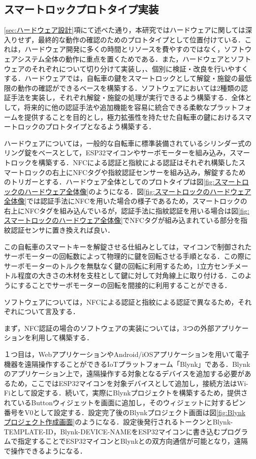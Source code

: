   \subsection{スマートロックプロトタイプ実装}
    \label{sec:スマートロックプロトタイプ実装}
      \par \ref{sec:ハードウェア設計}項にて述べた通り，本研究ではハードウェアに関しては深入りせず，最終的な動作の確認のためのプロトタイプとして位置付けている．これは，ハードウェア開発に多くの時間とリソースを費やすのではなく，ソフトウェアシステム全体の動作に重点を置くためである．また，ハードウェアとソフトウェアのそれぞれについて切り分けて実装し，、個別に検証・改良を行いやすくする．ハードウェアでは，自転車の鍵をスマートロックとして解錠・施錠の最低限の動作の確認ができるベースを構築する．ソフトウェアにおいては2種類の認証手法を実装し，それぞれ解錠・施錠の処理が実行できるよう構築する．全体として，将来的に他の認証手法や追加機能を容易に統合できる柔軟なプラットフォームを提供することを目的とし，極力拡張性を持たせた自転車の鍵におけるスマートロックのプロトタイプとなるよう構築する．
      \par ハードウェアについては，一般的な自転車に標準装備されているシリンダー式のリング錠をベースとして，ESP32マイコンやサーボモーターを組み込み，スマートロックを構築する．NFCによる認証と指紋による認証はそれぞれ構築したスマートロックの右上にNFCタグや指紋認証センサーを組み込み，解錠するためのトリガーとする．ハードウェア全体としてのプロトタイプは図\ref{fig:スマートロックのハードウェア全体像}のようになる．図\ref{fig:スマートロックのハードウェア全体像}では認証手法にNFCを用いた場合の様子であるため，スマートロックの右上にNFCタグを組み込んでいるが，認証手法に指紋認証を用いる場合は図\ref{fig:スマートロックのハードウェア全体像}でNFCタグが組み込まれている部分を指紋認証センサに置き換えれば良い．
      \par この自転車のスマートキーを解錠させる仕組みとしては，マイコンで制御されたサーボモーターの回転数によって物理的に鍵を回転させる手順となる．この際にサーボモーターのトルクを無駄なく鍵の回転に利用するため，1立方センチメートル程度の大きさの木材を支柱として鍵に対して対角線上に取り付ける．このようにすることでサーボモーターの回転を間接的に利用することができる．
      \par ソフトウェアについては，NFCによる認証と指紋による認証で異なるため，それぞれについて言及する．
      \par まず，NFC認証の場合のソフトウェアの実装については，3つの外部アプリケーションを利用して構築する．
      \par １つ目は，WebアプリケーションやAndroid/iOSアプリケーションを用いて電子機器を遠隔操作することができるIoTプラットフォーム「Blynk」である．Blynkのアプリケーション上で，遠隔操作する対象となるデバイスを追加する必要があるため，ここではESP32マイコンを対象デバイスとして追加し，接続方法はWi-Fiとして設定する．続いて，実際にBlynkプロジェクトを構築するため，提供されているButtonウィジェットを画面に追加し，そのウィジェットに対するピン番号をV0として設定する．設定完了後のBlynkプロジェクト画面は図\ref{fig:Blynkプロジェクト作成画面}のようになる．設定後発行されるトークンとBlynk-TEMPLATE-ID，Blynk-DEVICE-NAMEをESP32マイコンに書き込むプログラムで指定することでESP32マイコンとBlynkとの双方向通信が可能となり，遠隔で操作できるようになる．
